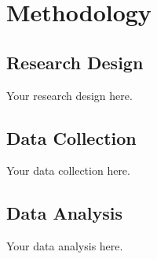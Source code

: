 \chapter{Methodology}
\section{Research Design}
Your research design here.
\section{Data Collection}
Your data collection here.
\section{Data Analysis}
Your data analysis here.
